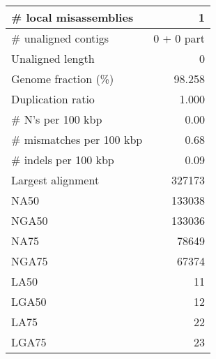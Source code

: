 \documentclass[12pt,a4paper]{article}
\begin{document}
\begin{table}[ht]
\begin{center}
\begin{tabular}{|l*{1}{|r}|}
\# local misassemblies & 1 \\ \hline
\# unaligned contigs & 0 + 0 part \\ \hline
Unaligned length & 0 \\ \hline
Genome fraction (\%) & 98.258 \\ \hline
Duplication ratio & 1.000 \\ \hline
\# N's per 100 kbp & 0.00 \\ \hline
\# mismatches per 100 kbp & 0.68 \\ \hline
\# indels per 100 kbp & 0.09 \\ \hline
Largest alignment & 327173 \\ \hline
NA50 & 133038 \\ \hline
NGA50 & 133036 \\ \hline
NA75 & 78649 \\ \hline
NGA75 & 67374 \\ \hline
LA50 & 11 \\ \hline
LGA50 & 12 \\ \hline
LA75 & 22 \\ \hline
LGA75 & 23 \\ \hline
\end{tabular}
\end{center}
\end{table}
\end{document}

